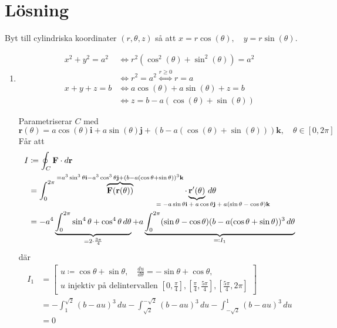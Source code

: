 \documentclass{article}
\renewcommand{\vec}[1]{\mathbf{#1}}
\begin{document}
\section*{Lösning}
Byt till cylindriska koordinater $(r, \theta, z)$ så att
$ x = r \cos(\theta), \quad y = r \sin(\theta) $.

\begin{enumerate}[label=\alph*)]
	\item
		\begin{align*}
			x^2 + y^2 = a^2 &\Leftrightarrow r^2 (\cos^2(\theta) + \sin^2(\theta)) = a^2 \\
			&\Leftrightarrow r^2 = a^2 \overset{r \ge 0}{\Leftrightarrow} r = a \\
			x + y + z = b &\Leftrightarrow a \cos(\theta) + a \sin(\theta) + z = b \\
			&\Leftrightarrow z = b - a (\cos(\theta) + \sin(\theta))
		\end{align*}

		Parametriserar $C$ med
		$$ \vec r(\theta) = a \cos(\theta) \vec i + a \sin(\theta) \vec j
			+ (b - a (\cos(\theta) + \sin(\theta))) \vec k, \quad \theta \in [0, 2\pi] $$
		Får att
		\begin{align*}
			I &\coloneqq \oint_C \vec F \cdot d\vec r \\
			&= \int^{2\pi}_0 \overbrace{\vec F(\vec r(\theta))}^{= a^3 \sin^3\theta \vec i - a^3 \cos^3\theta \vec j + (b - a (\cos\theta + \sin\theta))^3 \vec k} \cdot \underbrace{\vec r'(\theta)}_{\rlap{\scriptsize$= -a \sin\theta \vec i + a \cos\theta \vec j + a (\sin\theta - \cos\theta) \vec k$}} \, d\theta \\
			&= -a^4 \underbrace{\int^{2\pi}_0 \sin^4\theta + \cos^4\theta \, d\theta}_{=2 \cdot \frac{3\pi}4} + a \underbrace{\int^{2\pi}_0 (\sin\theta - \cos\theta)(b - a (\cos\theta + \sin\theta))^3 \, d\theta}_{\eqqcolon I_1}
		\end{align*}
		där
		\begin{align*}
			I_1 &= \begin{bmatrix}
				u \coloneqq \cos\theta + \sin\theta, \quad \frac{du}{d\theta} = -\sin\theta + \cos\theta, \\
				\text{$u$ injektiv på delintervallen $\left[0, \frac\pi4\right],
				\left[\frac\pi4, \frac{5\pi}4\right], \left[\frac{5\pi}4, 2\pi\right]$}
			\end{bmatrix} \\
			&= -\int_1^{\sqrt2} (b - au)^3 \, du - \int_{\sqrt2}^{-\sqrt2} (b - au)^3 \, du - \int_{-\sqrt2}^1 (b - au)^3 \, du \\
			&= 0
		\end{align*}


\end{enumerate}
\end{document}
